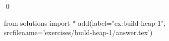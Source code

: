 
\begin{ex} 
  \label{ex:build-heap-1}
  
  \qed
\end{ex} 
\begin{python0}
from solutions import *
add(label="ex:build-heap-1",
    srcfilename='exercises/build-heap-1/answer.tex') 
\end{python0}
